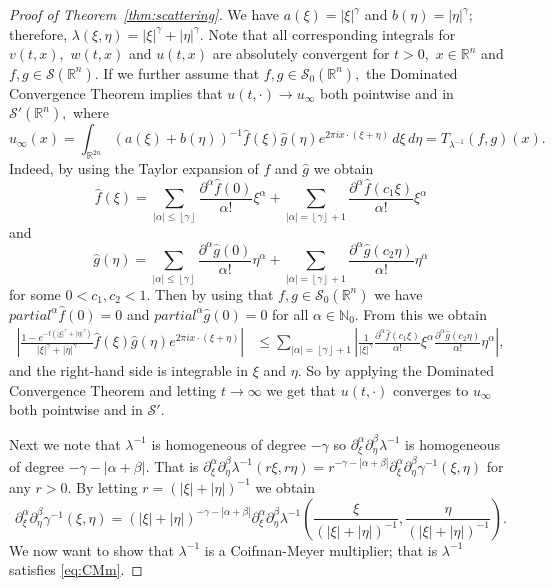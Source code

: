 \documentclass[10pt,a4paper]{article}
\theoremstyle{remark}
\newcommand{\re}{\mathbb{R}}
\newcommand{\rn}{{{\mathbb R}^n}}
\newcommand{\sw}{{\mathcal{S}}(\rn)}
\newcommand{\swp}{{\mathcal{S}'}(\rn)}
\newcommand{\swz}{{\mathcal{S}_0}(\rn)}
\newcommand{\fhat}{\widehat{f}}
\newcommand{\ghat}{\widehat{g}}
\newcommand{\eixxe}{e^{2\pi i x \cdot (\xi + \eta)}}
\newcommand{\dxi}{\, d\xi}
\newcommand{\deta}{\, d\eta}
\newcommand{\abs}[1]{\left\vert #1 \right\vert}
\begin{document}
 
 \begin{proof}[Proof of Theorem~\ref{thm:scattering}] We have $a(\xi)=\abs{\xi}^\gamma$ and $b(\eta)=\abs{\eta}^\gamma;$ therefore, $\lambda(\xi,\eta)=\abs{\xi}^\gamma+\abs{\eta}^\gamma.$ Note that all corresponding integrals for $v(t,x),$ $w(t,x)$ and $u(t,x)$ are absolutely convergent for $t>0,$ $x\in\rn$ and $f,g\in \sw.$ If we further assume that $f,g\in \swz,$ the Dominated Convergence Theorem implies that $u(t,\cdot)\to u_\infty$  both pointwise and in $\swp,$ where
$$
u_\infty(x)=\int_{\re^{2n}} (a(\xi)+b(\eta))^{-1}\fhat(\xi)\ghat(\eta)\eixxe\dxi\deta=T_{\lambda^{-1}} (f,g)(x).
$$
Indeed, by using the Taylor expansion of $\widehat{f}$ and $\widehat{g}$ we obtain
\[\widehat{f}(\xi) = 
\sum_{|\alpha|\leq 
\left\lfloor\gamma\right\rfloor} 
\frac{\partial^\alpha \widehat{f}(0)}{\alpha !}\xi^\alpha
 + \sum_{|\alpha| = 
 \left\lfloor\gamma\right\rfloor + 1} \frac{\partial^\alpha \widehat{f}(c_1 \xi)}{\alpha !}\xi^\alpha \]
and 
\[\widehat{g}(\eta) = \sum_{\abs{\alpha}\leq \left\lfloor\gamma\right\rfloor} \frac{\partial^\alpha \widehat{g}(0)}{\alpha !}\eta^\alpha + \sum_{\abs{\alpha} = \left\lfloor\gamma\right\rfloor + 1} \frac{\partial^\alpha \widehat{g}(c_2 \eta)}{\alpha !}\eta^\alpha \]
for some $0<c_1 , c_2 <1$. Then by using that $f,g \in \swz$ we have $partial^\alpha \widehat{f}(0) = 0$ and $partial^\alpha \widehat{g}(0) = 0$ for all $\alpha \in \mathbb{N}_0$. From this we obtain 
\begin{align*}
\abs{\frac{1-e^{-t(\abs{\xi}^\gamma + \abs{\eta}^\gamma)}}{\abs{\xi}^\gamma + \abs{\eta}^\gamma}\widehat{f}(\xi)\widehat{g}(\eta) e^{2\pi i x\cdot (\xi + \eta)}} &\leq \sum_{\abs{\alpha} = \left\lfloor\gamma\right\rfloor + 1} \abs{\frac{1}{\abs{\xi}^\gamma} \frac{\partial^\alpha \widehat{f}(c_1 \xi)}{\alpha !}\xi^\alpha\frac{\partial^\alpha \widehat{g}(c_2 \eta)}{\alpha !}\eta^\alpha}, 
\end{align*}
and the right-hand side is integrable in $\xi$ and $\eta$. So by applying the Dominated Convergence Theorem and letting $t \rightarrow \infty$ we get that $u(t,\cdot)$ converges to $u_\infty$ both pointwise and in $\mathcal{S}'$. 

Next we note that $\lambda^{-1}$ is homogeneous of degree $-\gamma$ so $\partial^\alpha_\xi \partial^\beta_\eta \lambda^{-1}$ is homogeneous of degree $-\gamma -|\alpha + \beta|$. That is $\partial^\alpha_\xi \partial^\beta_\eta \lambda^{-1} (r\xi, r\eta) = r^{-\gamma -|\alpha+\beta|}\partial^\alpha_\xi \partial^\beta_\eta \gamma^{-1}(\xi,\eta)$ for any $r>0$. By letting $r = (\abs{\xi} + \abs{\eta})^{-1}$ we obtain 
$$\partial^\alpha_\xi \partial^\beta_\eta \gamma^{-1}(\xi,\eta) = (\abs{\xi} + \abs{\eta})^{-\gamma -|\alpha+\beta|} \partial^\alpha_\xi \partial^\beta_\eta \lambda^{-1} (\frac{\xi}{(\abs{\xi} + \abs{\eta})^{-1}}, \frac{\eta}{(\abs{\xi} + \abs{\eta})^{-1}}).$$
We now want to show that $\lambda^{-1}$ is a Coifman-Meyer multiplier; that is $\lambda^{-1}$ satisfies \eqref{eq:CMm}.


\end{proof}
\end{document}
